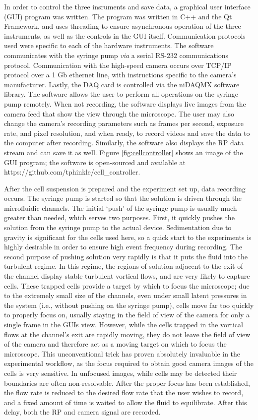 		In order to control the three insruments and save data, a graphical user interface (GUI) program was written. The program was written in C++ and the Qt Framework, and uses threading to ensure asynchronous operation of the three instruments, as well as the controls in the GUI itself. Communication protocols used were specific to each of the hardware instruments. The software communicates with the syringe pump \textit{via} a serial RS-232 communications protocol. Communication with the high-speed camera occurs over TCP/IP protocol over a 1 Gb ethernet line, with instructions specific to the camera's manufacturer. Lastly, the DAQ card is controlled via the niDAQMX software library. The software allows the user to perform all operations on the syringe pump remotely. When not recording, the software displays live images from the camera feed that show the view through the microscope. The user may also change the camera's recording parameters such as frames per second, exposure rate, and pixel resolution, and when ready, to record videos and save the data to the computer after recording. Similarly, the software also displays the RP data stream and can save it as well. Figure \ref{fig:cellcontroller} shows an image of the GUI program; the software is open-sourced and available at https://github.com/tphinkle/cell\_controller.
		
		After the cell suspension is prepared and the experiment set up, data recording occurs. The syringe pump is started so that the solution is driven through the microfluidic channels. The initial `push' of the syringe pump is usually much greater than needed, which serves two purposes. First, it quickly pushes the solution from the syringe pump to the actual device. Sedimentation due to gravity is significant for the cells used here, so a quick start to the experiments is highly desirable in order to ensure high event frequency during recording. The second purpose of pushing solution very rapidly is that it puts the fluid into the turbulent regime. In this regime, the regions of solution adjacent to the exit of the channel display stable turbulent vortical flows, and are very likely to capture cells. These trapped cells provide a target by which to focus the microscope; due to the extremely small size of the channels, even under small latent pressures in the system (i.e., without pushing on the syringe pump), cells move far too quickly to properly focus on, usually staying in the field of view of the camera for only a single frame in the GUIs view. However, while the cells trapped in the vortical flows at the channel's exit are rapidly moving, they do not leave the field of view of the camera and therefore act as a moving target on which to focus the microscope. This unconventional trick has proven absolutely invaluable in the experimental workflow, as the focus required to obtain good camera images of the cells is very sensitive. In unfocused images, while cells may be detected their boundaries are often non-resolvable. After the proper focus has been established, the flow rate is reduced to the desired flow rate that the user wishes to record, and a fixed amount of time is waited to allow the fluid to equilibrate. After this delay, both the RP and camera signal are recorded. 
		
		
		
		
		

		
		


